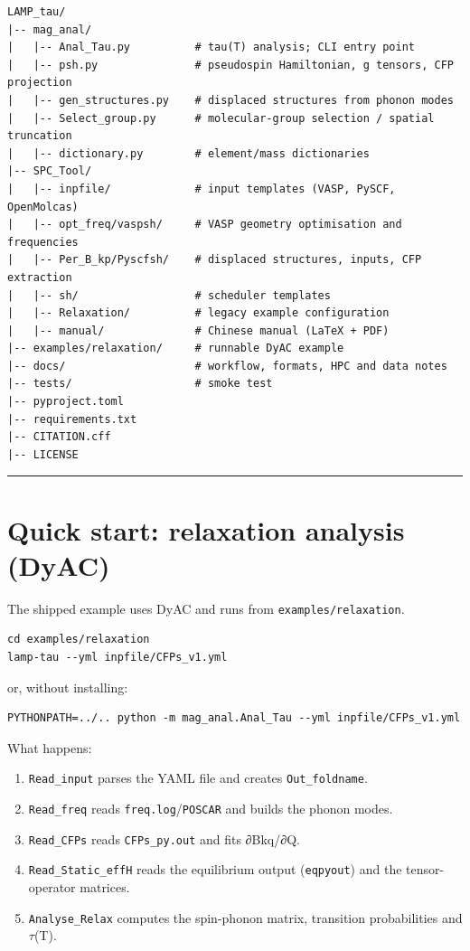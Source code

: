 \documentclass[11pt,a4paper]{article}
\providecommand{\tightlist}{%
  \setlength{\itemsep}{0pt}\setlength{\parskip}{0pt}}
\begin{document}
\begin{lstlisting}
LAMP_tau/
|-- mag_anal/
|   |-- Anal_Tau.py          # tau(T) analysis; CLI entry point
|   |-- psh.py               # pseudospin Hamiltonian, g tensors, CFP projection
|   |-- gen_structures.py    # displaced structures from phonon modes
|   |-- Select_group.py      # molecular-group selection / spatial truncation
|   |-- dictionary.py        # element/mass dictionaries
|-- SPC_Tool/
|   |-- inpfile/             # input templates (VASP, PySCF, OpenMolcas)
|   |-- opt_freq/vaspsh/     # VASP geometry optimisation and frequencies
|   |-- Per_B_kp/Pyscfsh/    # displaced structures, inputs, CFP extraction
|   |-- sh/                  # scheduler templates
|   |-- Relaxation/          # legacy example configuration
|   |-- manual/              # Chinese manual (LaTeX + PDF)
|-- examples/relaxation/     # runnable DyAC example
|-- docs/                    # workflow, formats, HPC and data notes
|-- tests/                   # smoke test
|-- pyproject.toml
|-- requirements.txt
|-- CITATION.cff
|-- LICENSE
\end{lstlisting}

\begin{center}\rule{0.5\linewidth}{0.4pt}\end{center}

\section{Quick start: relaxation analysis
(DyAC)}\label{quick-start-relaxation-analysis-dyac}

The shipped example uses DyAC and runs from \texttt{examples/relaxation}.

\begin{lstlisting}
cd examples/relaxation
lamp-tau --yml inpfile/CFPs_v1.yml
\end{lstlisting}

or, without installing:

\begin{lstlisting}
PYTHONPATH=../.. python -m mag_anal.Anal_Tau --yml inpfile/CFPs_v1.yml
\end{lstlisting}

What happens:

\begin{enumerate}
\def\labelenumi{\arabic{enumi}.}
\tightlist
\item
  \texttt{Read\_input} parses the YAML file and creates
  \texttt{Out\_foldname}.
\item
  \texttt{Read\_freq} reads \texttt{freq.log}/\texttt{POSCAR} and builds
  the phonon modes.
\item
  \texttt{Read\_CFPs} reads \texttt{CFPs\_py.out} and fits ∂Bkq/∂Q.
\item
  \texttt{Read\_Static\_effH} reads the equilibrium output
  (\texttt{eqpyout}) and the tensor-operator matrices.
\item
  \texttt{Analyse\_Relax} computes the spin-phonon matrix, transition
  probabilities and \(\tau\)(T).
\end{enumerate}
\end{document}
